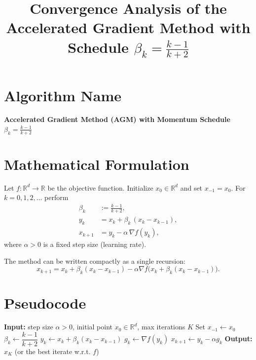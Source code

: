 \documentclass{article}
\newcommand{\R}{\mathbb{R}}
\begin{document}
\title{Convergence Analysis of the Accelerated Gradient Method with Schedule \(\beta_k=\frac{k-1}{k+2}\)}
\author{}
\date{}
\maketitle

\tableofcontents

\section*{Algorithm Name}
\begin{center}
\textbf{Accelerated Gradient Method (AGM) with Momentum Schedule } \(\displaystyle \beta_k=\frac{k-1}{k+2}\)
\end{center}
\section*{Mathematical Formulation}
Let \(f:\R^{d}\rightarrow\R\) be the objective function.  
Initialize \(x_0\in\R^{d}\) and set \(x_{-1}=x_0\).  
For \(k=0,1,2,\dots\) perform
\begin{align}
    \beta_k &:= \frac{k-1}{k+2}, \label{eq:beta}\\[4pt]
    y_k    &= x_k + \beta_k\,(x_k-x_{k-1}), \label{eq:y}\\[4pt]
    x_{k+1}&= y_k - \alpha \,\nabla f(y_k), \label{eq:x}
\end{align}
where \(\alpha>0\) is a fixed step size (learning rate).  

The method can be written compactly as a single recursion:
\[
x_{k+1}=x_k+\beta_k (x_k-x_{k-1})-\alpha \nabla f\!\bigl(x_k+\beta_k (x_k-x_{k-1})\bigr).
\]

\section*{Pseudocode}
\begin{algorithm}[H]
\caption{AGM with \(\beta_k=\frac{k-1}{k+2}\)}
\begin{algorithmic}[1]
\STATE \textbf{Input:} step size \(\alpha>0\), initial point \(x_0\in\R^d\), max iterations \(K\)
\STATE Set \(x_{-1}\leftarrow x_0\)
    \STATE \(\beta_k \gets \dfrac{k-1}{k+2}\) \hfill{}
    \STATE \(y_k \gets x_k + \beta_k (x_k-x_{k-1})\)
    \STATE \(g_k \gets \nabla f(y_k)\)
    \STATE \(x_{k+1} \gets y_k - \alpha g_k\)
\ENDFOR
\STATE \textbf{Output:} \(x_K\) (or the best iterate w.r.t. \(f\))
\end{algorithmic}
\end{algorithm}
\end{document}
